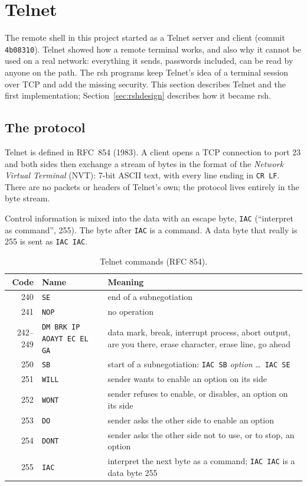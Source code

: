 \section{Telnet}
\label{sec:telnet}

The remote shell in this project started as a Telnet server and client
(commit \texttt{4b08310}). Telnet showed how a remote terminal works, and also
why it cannot be used on a real network: everything it sends, passwords
included, can be read by anyone on the path. The rsh programs keep Telnet's
idea of a terminal session over TCP and add the missing security. This section
describes Telnet and the first implementation; Section~\ref{sec:rshdesign}
describes how it became rsh.

\subsection{The protocol}

Telnet is defined in RFC~854 (1983). A client opens a TCP connection to port
23 and both sides then exchange a stream of bytes in the format of the
\emph{Network Virtual Terminal} (NVT): 7-bit ASCII text, with every line ending
in \texttt{CR LF}. There are no packets or headers of Telnet's own; the
protocol lives entirely in the byte stream.

Control information is mixed into the data with an escape byte,
\texttt{IAC} (``interpret as command'', 255). The byte after \texttt{IAC} is a
command. A data byte that really is 255 is sent as \texttt{IAC IAC}.

\begin{table}[H]
\centering
\small
\begin{tabularx}{\textwidth}{@{}r p{3.4cm} X@{}}
\toprule
Code & Name & Meaning \\
\midrule
240 & \texttt{SE}   & end of a subnegotiation \\
241 & \texttt{NOP}  & no operation \\
242--249 & \texttt{DM BRK IP AO}\newline \texttt{AYT EC EL GA} & data mark, break, interrupt process, abort output, are you there, erase character, erase line, go ahead \\
250 & \texttt{SB}   & start of a subnegotiation: \texttt{IAC SB} \textit{option} \ldots\ \texttt{IAC SE} \\
251 & \texttt{WILL} & sender wants to enable an option on its side \\
252 & \texttt{WONT} & sender refuses to enable, or disables, an option on its side \\
253 & \texttt{DO}   & sender asks the other side to enable an option \\
254 & \texttt{DONT} & sender asks the other side not to use, or to stop, an option \\
255 & \texttt{IAC}  & interpret the next byte as a command; \texttt{IAC IAC} is a data byte 255 \\
\bottomrule
\end{tabularx}
\caption{Telnet commands (RFC 854).}
\end{table}

